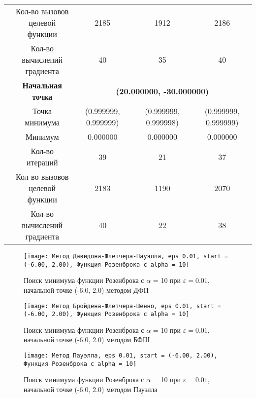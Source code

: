 \begin{table}[H]
\begin{tabular}{|c|c|c|c|c|}
	\cline{2-5}
	&\makecell{Кол-во вызовов\\целевой функции} &2185 &1912 &2186 \\ 
	\cline{2-5}
	&\makecell{Кол-во вычислений\\градиента} &40 &35 &40 \\ 
	\cline{2-5}
\cline{2-5}&\textbf{Начальная точка} &\multicolumn{3}{c|}{\textbf{(20.000000, -30.000000)}}\\
	\cline{2-5}
	&Точка минимума &(0.999999, 0.999999) &(0.999999, 0.999998) &(0.999999, 0.999999) \\ 
	\cline{2-5}
	&Минимум &0.000000 &0.000000 &0.000000 \\ 
	\cline{2-5}
	&Кол-во итераций &39 &21 &37 \\ 
	\cline{2-5}
	&\makecell{Кол-во вызовов\\целевой функции} &2183 &1190 &2070 \\ 
	\cline{2-5}
	&\makecell{Кол-во вычислений\\градиента} &40 &22 &38 \\ 
	\cline{2-5}
	\hline

\end{tabular}
\end{table}


            \begin{figure}[H]
	        \centering
	        \texttt{[image: Метод Давидона-Флетчера-Пауэлла, eps 0.01, start = (-6.00, 2.00), Функция Розенброка с alpha = 10]}%
	        \caption{Поиск минимума функции Розенброка с $\alpha$ = 10 при $\varepsilon = 0.01$, начальной точке (-6.0, 2.0) методом ДФП}
	        \vspace*{-1.2cm}
            \end{figure}
            
            \begin{figure}[H]
	        \centering
	        \texttt{[image: Метод Бройдена-Флетчера-Шенно, eps 0.01, start = (-6.00, 2.00), Функция Розенброка с alpha = 10]}%
	        \caption{Поиск минимума функции Розенброка с $\alpha$ = 10 при $\varepsilon = 0.01$, начальной точке (-6.0, 2.0) методом БФШ}
	        \vspace*{-1.2cm}
            \end{figure}
            
            \begin{figure}[H]
	        \centering
	        \texttt{[image: Метод Пауэлла, eps 0.01, start = (-6.00, 2.00), Функция Розенброка с alpha = 10]}%
	        \caption{Поиск минимума функции Розенброка с $\alpha$ = 10 при $\varepsilon = 0.01$, начальной точке (-6.0, 2.0) методом Пауэлла}
	        \vspace*{-1.2cm}
            \end{figure}
            
